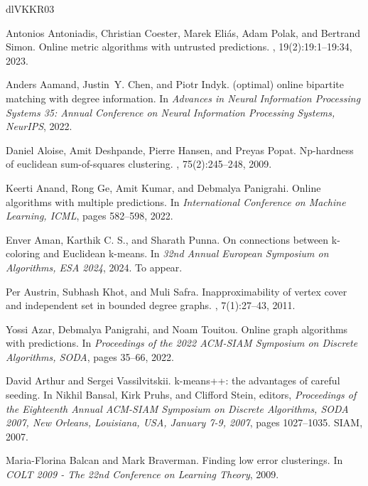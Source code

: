 \documentclass[10pt,a4paper]{amsart}
\begin{document}
\newcommand{\etalchar}[1]{$^{#1}$}
\begin{thebibliography}{dlVKKR03}

\bibitem[ACE{\etalchar{+}}23]{AntoniadisCEPS23}
Antonios Antoniadis, Christian Coester, Marek Eli{\'{a}}s, Adam Polak, and Bertrand Simon.
\newblock Online metric algorithms with untrusted predictions.
, 19(2):19:1--19:34, 2023.

Anders Aamand, Justin~Y. Chen, and Piotr Indyk.
\newblock (optimal) online bipartite matching with degree information.
\newblock In {\em Advances in Neural Information Processing Systems 35: Annual Conference on Neural Information Processing Systems, NeurIPS}, 2022.

Daniel Aloise, Amit Deshpande, Pierre Hansen, and Preyas Popat.
\newblock Np-hardness of euclidean sum-of-squares clustering.
, 75(2):245--248, 2009.

Keerti Anand, Rong Ge, Amit Kumar, and Debmalya Panigrahi.
\newblock Online algorithms with multiple predictions.
\newblock In {\em International Conference on Machine Learning, {ICML}}, pages 582--598, 2022.

Enver Aman, {Karthik {C. S.}}, and Sharath Punna.
\newblock On connections between k-coloring and {Euclidean} k-means.
\newblock In {\em 32nd Annual European Symposium on Algorithms, {ESA} 2024}, 2024.
\newblock To appear.

Per Austrin, Subhash Khot, and Muli Safra.
\newblock Inapproximability of vertex cover and independent set in bounded degree graphs.
, 7(1):27--43, 2011.

Yossi Azar, Debmalya Panigrahi, and Noam Touitou.
\newblock Online graph algorithms with predictions.
\newblock In {\em Proceedings of the 2022 {ACM-SIAM} Symposium on Discrete Algorithms, {SODA}}, pages 35--66, 2022.

David Arthur and Sergei Vassilvitskii.
\newblock k-means++: the advantages of careful seeding.
\newblock In Nikhil Bansal, Kirk Pruhs, and Clifford Stein, editors, {\em Proceedings of the Eighteenth Annual {ACM-SIAM} Symposium on Discrete Algorithms, {SODA} 2007, New Orleans, Louisiana, USA, January 7-9, 2007}, pages 1027--1035. {SIAM}, 2007.

Maria{-}Florina Balcan and Mark Braverman.
\newblock Finding low error clusterings.
\newblock In {\em {COLT} 2009 - The 22nd Conference on Learning Theory}, 2009.


\end{thebibliography}
\end{document}
